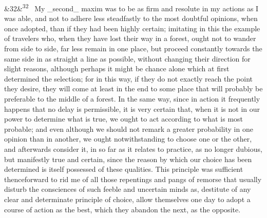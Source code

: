 \documentclass[12pt]{article}
\newcommand{\para}[1][]{\par\noindent\ifx&#1&\else\textsuperscript{\footnotesize #1}~\fi}
\begin{document}
\para[32] My \_second\_ maxim was to be as firm and resolute in my actions as I was able, and not to adhere less steadfastly to the most doubtful opinions, when once adopted, than if they had been highly certain; imitating in this the example of travelers who, when they have lost their way in a forest, ought not to wander from side to side, far less remain in one place, but proceed constantly towards the same side in as straight a line as possible, without changing their direction for slight reasons, although perhaps it might be chance alone which at first determined the selection; for in this way, if they do not exactly reach the point they desire, they will come at least in the end to some place that will probably be preferable to the middle of a forest. In the same way, since in action it frequently happens that no delay is permissible, it is very certain that, when it is not in our power to determine what is true, we ought to act according to what is most probable; and even although we should not remark a greater probability in one opinion than in another, we ought notwithstanding to choose one or the other, and afterwards consider it, in so far as it relates to practice, as no longer dubious, but manifestly true and certain, since the reason by which our choice has been determined is itself possessed of these qualities. This principle was sufficient thenceforward to rid me of all those repentings and pangs of remorse that usually disturb the consciences of such feeble and uncertain minds as, destitute of any clear and determinate principle of choice, allow themselves one day to adopt a course of action as the best, which they abandon the next, as the opposite.
\end{document}
